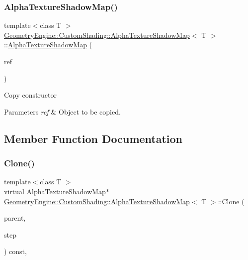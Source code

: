 \subsubsection{\texorpdfstring{AlphaTextureShadowMap()}{AlphaTextureShadowMap()}\hspace{0.1cm}{\footnotesize\ttfamily [2/2]}}
{\footnotesize\ttfamily template$<$class T $>$ \\
\mbox{\hyperlink{class_geometry_engine_1_1_custom_shading_1_1_alpha_texture_shadow_map}{Geometry\+Engine\+::\+Custom\+Shading\+::\+Alpha\+Texture\+Shadow\+Map}}$<$ T $>$\+::\mbox{\hyperlink{class_geometry_engine_1_1_custom_shading_1_1_alpha_texture_shadow_map}{Alpha\+Texture\+Shadow\+Map}} (\begin{DoxyParamCaption}\item[{const \mbox{\hyperlink{class_geometry_engine_1_1_custom_shading_1_1_custom_shading_step}{Custom\+Shading\+Step}} \&}]{ref }\end{DoxyParamCaption})\hspace{0.3cm}{\ttfamily [inline]}}

Copy constructor 
\begin{DoxyParams}{Parameters}
{\em ref} & Object to be copied. \\
\hline
\end{DoxyParams}


\subsection{Member Function Documentation}
\mbox{\label{class_geometry_engine_1_1_custom_shading_1_1_alpha_texture_shadow_map_a5ff646b3f8b6da56acd2d98f09265769}} 
\subsubsection{\texorpdfstring{Clone()}{Clone()}}
{\footnotesize\ttfamily template$<$class T $>$ \\
virtual \mbox{\hyperlink{class_geometry_engine_1_1_custom_shading_1_1_alpha_texture_shadow_map}{Alpha\+Texture\+Shadow\+Map}}$\ast$ \mbox{\hyperlink{class_geometry_engine_1_1_custom_shading_1_1_alpha_texture_shadow_map}{Geometry\+Engine\+::\+Custom\+Shading\+::\+Alpha\+Texture\+Shadow\+Map}}$<$ T $>$\+::Clone (\begin{DoxyParamCaption}\item[{\mbox{\hyperlink{class_geometry_engine_1_1_custom_shading_1_1_custom_shading_interface}{Custom\+Shading\+Interface}} $\ast$}]{parent,  }\item[{\mbox{\hyperlink{namespace_geometry_engine_1_1_custom_shading_a2dc236a5b567da5099069ce2b2be5609}{Custom\+Shading\+Steps}}}]{step }\end{DoxyParamCaption}) const\hspace{0.3cm}{\ttfamily [inline]}, {\ttfamily [virtual]}}

